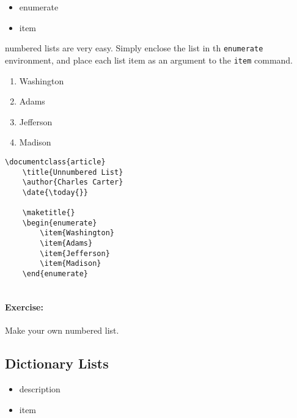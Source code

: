         \begin{framed}
            \begin{itemize}
                \item{enumerate}
                \item{item}
            \end{itemize}
        \end{framed}

        \Lx{} numbered lists are very easy. Simply enclose the list in th \texttt{enumerate} environment, and place each list item as an argument to the \texttt{item} command.

    \begin{enumerate}
        \item{Washington}
        \item{Adams}
        \item{Jefferson}
        \item{Madison}
    \end{enumerate}

        \begin{verbatim}
\documentclass{article}
    \title{Unnumbered List}
    \author{Charles Carter}
    \date{\today{}}
 
    \maketitle{}
    \begin{enumerate}
        \item{Washington}
        \item{Adams}
        \item{Jefferson}
        \item{Madison}
    \end{enumerate}
    
        \end{verbatim}

        \paragraph{Exercise:} Make your own numbered list.

        \subsection{Dictionary Lists}
        \label{Dictionary Lists}
        
        \begin{framed}
            \begin{itemize}
                \item{description}
                \item{item}
            \end{itemize}
        \end{framed}

